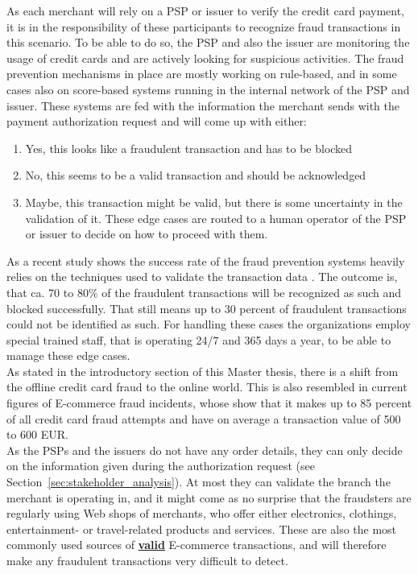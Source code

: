 As each merchant will rely on a \gls{PSP} or issuer to verify the credit card payment, it is in the responsibility of these participants to recognize fraud transactions in this scenario. To be able to do so, the \gls{PSP} and also the issuer are monitoring the usage of credit cards and are actively looking for suspicious activities. The fraud prevention mechanisms in place are mostly working on rule-based, and in some cases also on score-based systems running in the internal network of the \gls{PSP} and issuer. These systems are fed with the information the merchant sends with the payment authorization request and will come up with either:\@

\begin{enumerate}
  \item Yes, this looks like a fraudulent transaction and has to be blocked
  \item No, this seems to be a valid transaction and should be acknowledged
  \item Maybe, this transaction might be valid, but there is some uncertainty in the validation of it. These edge cases are routed to a human operator of the \gls{PSP} or issuer to decide on how to proceed with them.
\end{enumerate}

As a recent study shows the success rate of the fraud prevention systems heavily relies on the techniques used to validate the transaction data \citep{rana2015survey}. The outcome is, that ca. 70 to 80\% of the fraudulent transactions will be recognized as such and blocked successfully. That still means up to 30 percent of fraudulent transactions could not be identified as such. For handling these cases the organizations employ special trained staff, that is operating 24/7 and 365 days a year, to be able to manage these edge cases. \\

As stated in the introductory section of this Master thesis, there is a shift from the offline credit card fraud to the online world. This is also resembled in current figures of \gls{E-commerce} fraud incidents, whose show that it makes up to 85 percent of all credit card fraud attempts and have on average a transaction value of 500 to 600 EUR.\\

As the \gls{PSP}s and the issuers do not have any order details, they can only decide on the information given during the authorization request (see Section~\ref{sec:stakeholder_analysis}). At most they can validate the branch the merchant is operating in, and it might come as no surprise that the fraudsters are regularly using Web shops of merchants, who offer either electronics, clothings, entertainment- or travel-related products and services. These are also the most commonly used sources of \textbf{\underline{valid}} \gls{E-commerce} transactions, and will therefore make any fraudulent transactions very difficult to detect. \\

